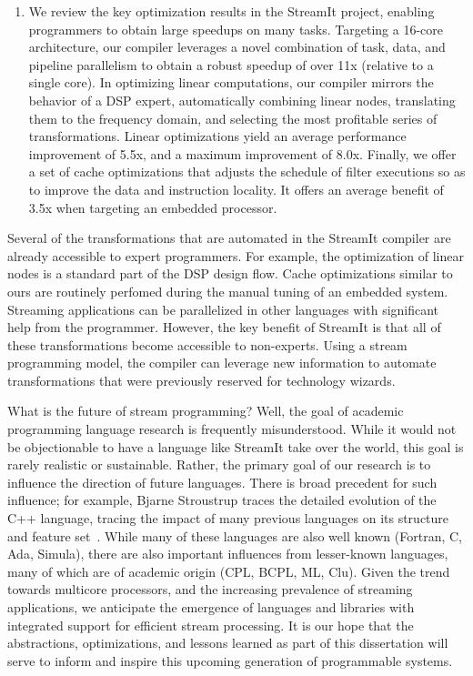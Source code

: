 \begin{enumerate}
\item We review the key optimization results in the StreamIt project, 
enabling programmers to obtain large speedups on many tasks.
Targeting a 16-core architecture, our compiler leverages a novel
combination of task, data, and pipeline parallelism to obtain a robust
speedup of over 11x (relative to a single core).  In optimizing linear
computations, our compiler mirrors the behavior of a DSP expert,
automatically combining linear nodes, translating them to the
frequency domain, and selecting the most profitable series of
transformations.  Linear optimizations yield an average performance
improvement of 5.5x, and a maximum improvement of 8.0x.  Finally, we
offer a set of cache optimizations that adjusts the schedule of filter
executions so as to improve the data and instruction locality.  It
offers an average benefit of 3.5x when targeting an embedded
processor.

\end{enumerate}

Several of the transformations that are automated in the StreamIt
compiler are already accessible to expert programmers.  For example,
the optimization of linear nodes is a standard part of the DSP design
flow.  Cache optimizations similar to ours are routinely perfomed
during the manual tuning of an embedded system.  Streaming
applications can be parallelized in other languages with significant
help from the programmer.  However, the key benefit of StreamIt is
that all of these transformations become accessible to non-experts.
Using a stream programming model, the compiler can leverage new
information to automate transformations that were previously reserved
for technology wizards.

What is the future of stream programming?  Well, the goal of academic
programming language research is frequently misunderstood.  While it
would not be objectionable to have a language like StreamIt take over
the world, this goal is rarely realistic or sustainable.  Rather, the
primary goal of our research is to influence the direction of future
languages.  There is broad precedent for such influence; for example,
Bjarne Stroustrup traces the detailed evolution of the C++ language,
tracing the impact of many previous languages on its structure and
feature set~\cite{stroustrup_design_1994}.  While many of these
languages are also well known (Fortran, C, Ada, Simula), there are
also important influences from lesser-known languages, many of which
are of academic origin (CPL, BCPL, ML, Clu).  Given the trend towards
multicore processors, and the increasing prevalence of streaming
applications, we anticipate the emergence of languages and libraries
with integrated support for efficient stream processing.  It is our
hope that the abstractions, optimizations, and lessons learned as part
of this dissertation will serve to inform and inspire this upcoming
generation of programmable systems.


